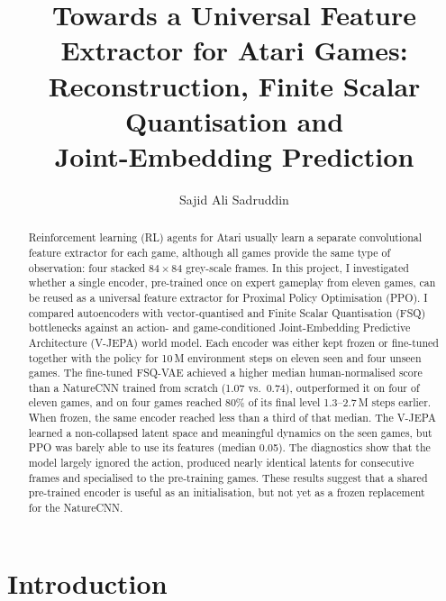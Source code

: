 \documentclass[runningheads]{llncs}
\begin{document}
\title{Towards a Universal Feature Extractor for Atari Games:\\
Reconstruction, Finite Scalar Quantisation and\\ Joint-Embedding Prediction}

\author{Sajid Ali Sadruddin}

\maketitle

\begin{abstract}
Reinforcement learning (RL) agents for Atari usually learn a separate convolutional feature
extractor for each game, although all games provide the same type of observation: four
stacked $84\times84$ grey-scale frames. In this project, I investigated whether a single
encoder, pre-trained once on expert gameplay from eleven games, can be reused as a universal
feature extractor for Proximal Policy Optimisation (PPO). I compared autoencoders with
vector-quantised and Finite Scalar Quantisation (FSQ) bottlenecks against an action- and
game-conditioned Joint-Embedding Predictive Architecture (V-JEPA) world model. Each encoder was
either kept frozen or fine-tuned together with the policy for 10\,M environment steps on
eleven seen and four unseen games. The fine-tuned FSQ-VAE achieved a higher median
human-normalised score than a NatureCNN trained from scratch (1.07 vs.\ 0.74), outperformed it
on four of eleven games, and on four games reached 80\% of its final level 1.3--2.7\,M steps
earlier. When frozen, the same encoder reached less than a third of that median. The V-JEPA
learned a non-collapsed latent space and meaningful dynamics on the seen games, but PPO was
barely able to use its features (median 0.05). The diagnostics show that the model largely
ignored the action, produced nearly identical latents for consecutive frames and specialised
to the pre-training games. These results suggest that a shared pre-trained encoder is useful
as an initialisation, but not yet as a frozen replacement for the NatureCNN.
\end{abstract}

\section{Introduction}
\label{sec:intro}
\end{document}

